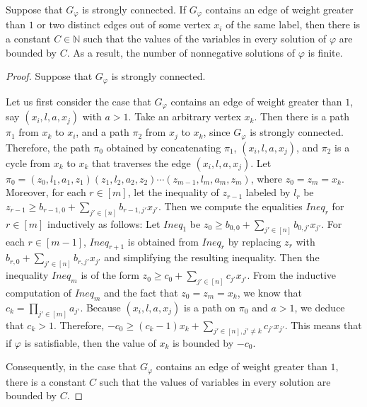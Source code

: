 \documentclass[runningheads]{llncs}
\newcommand\natnum{\mathbb{N}}
\begin{document}
\begin{proposition}\label{prop-g-1}
Suppose that $G_\varphi$ is strongly connected. If $G_\varphi$ contains an edge of weight greater than $1$ or two distinct edges out of some vertex $x_i$ of the same label, then there is a constant $C \in \natnum$ such that  the values of  the variables in every solution of $\varphi$ are bounded by $C$. As a result, the number of nonnegative solutions of $\varphi$ is finite. 
\end{proposition}

\begin{proof}
Suppose that $G_\varphi$ is strongly connected. 

Let us first consider the case that $G_\varphi$ contains an edge of weight greater than $1$, say $(x_i, l, a, x_j)$ with $a > 1$. Take an arbitrary vertex $x_k$. Then there is a path $\pi_1$ from $x_k$ to $x_i$, and a path $\pi_2$ from $x_j$ to $x_k$, since $G_\varphi$ is strongly connected. Therefore, the path $\pi_0$ obtained by concatenating $\pi_1$, $(x_i, l, a, x_j)$, and $\pi_2$ is a cycle from $x_k$ to $x_k$ that traverses the edge $(x_i, l, a, x_j)$. Let $\pi_0 = (z_0, l_1, a_1, z_1)  (z_1, l_2, a_2, z_2) \cdots (z_{m-1}, l_m, a_m, z_m)$, where $z_0 = z_m = x_k$. Moreover, for each $r \in [m]$, let the inequality of $z_{r-1}$ labeled by $l_r$ be $z_{r-1} \ge b_{r-1,0} + \sum \limits_{j' \in [n]} b_{r-1, j'} x_{j'}$. Then we compute the equalities $Ineq_r$ for $r \in [m]$ inductively as follows: Let $Ineq_1$ be $z_{0} \ge b_{0,0} + \sum \limits_{j' \in [n]} b_{0, j'} x_{j'}$. For each $r \in [m-1]$, $Ineq_{r+1}$ is obtained from $Ineq_{r}$ by replacing $z_{r}$ with  $b_{r,0} + \sum \limits_{j' \in [n]} b_{r, j'} x_{j'}$ and simplifying the resulting inequality. 
Then the inequality $Ineq_m$ is of the form $z_0 \ge c_0 + \sum \limits_{j' \in [n]} c_{j'} x_{j'}$. From the inductive computation of $Ineq_m$ and the fact that $z_0 = z_m = x_k$, we know that $c_k = \prod_{j' \in [m]} a_{j'}$.  
Because $(x_i, l, a, x_j)$ is a path on $\pi_0$ and $a > 1$, we deduce that $c_k > 1$. Therefore, $-c_0  \ge (c_k-1) x_k + \sum \limits_{j' \in [n], j' \neq k} c_{j'} x_{j'}$. This means that if $\varphi$ is satisfiable, then the value of $x_k$ is bounded by $-c_0$. 

Consequently, in the case that $G_\varphi$ contains an edge of weight greater than $1$, there is a constant $C$ such that the values of variables in every solution are bounded by $C$. 


\end{proof}
\end{document}
